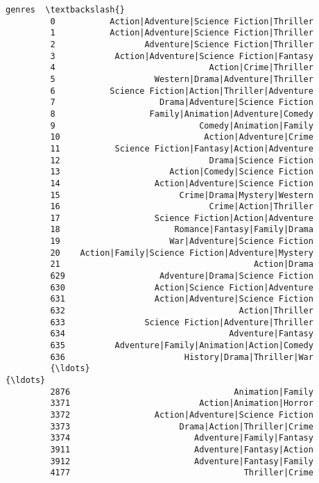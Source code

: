\documentclass[11pt]{article}
\begin{document}
\begin{Verbatim}[commandchars=\\\{\}]
                                                        genres  \textbackslash{}
         0           Action|Adventure|Science Fiction|Thriller   
         1           Action|Adventure|Science Fiction|Thriller   
         2                  Adventure|Science Fiction|Thriller   
         3            Action|Adventure|Science Fiction|Fantasy   
         4                               Action|Crime|Thriller   
         5                    Western|Drama|Adventure|Thriller   
         6           Science Fiction|Action|Thriller|Adventure   
         7                     Drama|Adventure|Science Fiction   
         8                   Family|Animation|Adventure|Comedy   
         9                             Comedy|Animation|Family   
         10                             Action|Adventure|Crime   
         11           Science Fiction|Fantasy|Action|Adventure   
         12                              Drama|Science Fiction   
         13                      Action|Comedy|Science Fiction   
         14                   Action|Adventure|Science Fiction   
         15                        Crime|Drama|Mystery|Western   
         16                              Crime|Action|Thriller   
         17                   Science Fiction|Action|Adventure   
         18                       Romance|Fantasy|Family|Drama   
         19                      War|Adventure|Science Fiction   
         20    Action|Family|Science Fiction|Adventure|Mystery   
         21                                       Action|Drama   
         629                   Adventure|Drama|Science Fiction   
         630                  Action|Science Fiction|Adventure   
         631                  Action|Adventure|Science Fiction   
         632                                   Action|Thriller   
         633                Science Fiction|Adventure|Thriller   
         634                                 Adventure|Fantasy   
         635          Adventure|Family|Animation|Action|Comedy   
         636                        History|Drama|Thriller|War   
         {\ldots}                                               {\ldots}   
         2876                                 Animation|Family   
         3371                          Action|Animation|Horror   
         3372                 Action|Adventure|Science Fiction   
         3373                      Drama|Action|Thriller|Crime   
         3374                         Adventure|Family|Fantasy   
         3911                         Adventure|Fantasy|Action   
         3912                         Adventure|Fantasy|Family   
         4177                                   Thriller|Crime   

\end{Verbatim}
\end{document}
